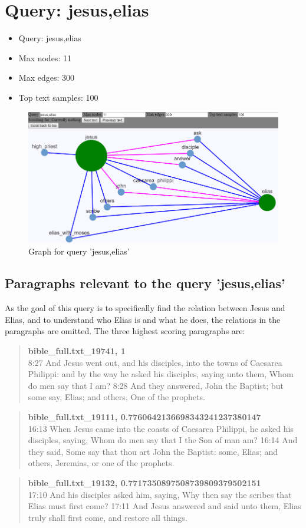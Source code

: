 \section{Query: jesus,elias}
\label{sec:query_jesus,elias}
\begin{itemize}
    \item Query: jesus,elias
    \item Max nodes: 11
    \item Max edges: 300
    \item Top text samples: 100
\end{itemize}
\begin{figure}[H]
    \centering
    \includegraphics[scale=0.8]{fig/jesus,elias}
    \caption{Graph for query 'jesus,elias'}
        \label{fig:query_jesus,elias}
\end{figure}

\clearpage
\subsection{Paragraphs relevant to the query 'jesus,elias'}
\label{subsec:jesuselias}
As the goal of this query is to specifically find the relation between Jesus and Elias, and to understand who Elias is and what he does, the relations in the paragraphs are omitted. The three highest scoring paragraphs are:
\blockquote{
\textbf{bible\_full.txt\_19741, 1}\\
8:27 And Jesus went out, and his disciples, into the towns of Caesarea Philippi: and by the way he asked his disciples, saying unto them, Whom do men say that I am? 8:28 And they answered, John the Baptist; but some say, Elias; and others, One of the prophets.}
\blockquote{
\textbf{bible\_full.txt\_19111, 0.7760642136698343241237380147}\\
16:13 When Jesus came into the coasts of Caesarea Philippi, he asked his disciples, saying, Whom do men say that I the Son of man am? 16:14 And they said, Some say that thou art John the Baptist: some, Elias; and others, Jeremias, or one of the prophets.}
\blockquote{
\textbf{bible\_full.txt\_19132, 0.7717350897508739809379502151}\\
17:10 And his disciples asked him, saying, Why then say the scribes that Elias must first come? 17:11 And Jesus answered and said unto them, Elias truly shall first come, and restore all things.}

